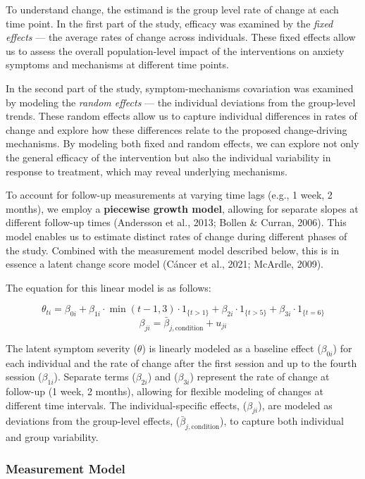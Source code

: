 \documentclass[
  man,floatsintext]{apa7}
\begin{document}
To understand change, the estimand is the group level rate of change at each time point.
In the first part of the study, efficacy was examined by the \emph{fixed effects} --- the average rates of change across individuals.
These fixed effects allow us to assess the overall population-level impact of the interventions on anxiety symptoms and mechanisms at different time points.

In the second part of the study, symptom-mechanisms covariation was examined by modeling the \emph{random effects} --- the individual deviations from the group-level trends.
These random effects allow us to capture individual differences in rates of change and explore how these differences relate to the proposed change-driving mechanisms.
By modeling both fixed and random effects, we can explore not only the general efficacy of the intervention but also the individual variability in response to treatment, which may reveal underlying mechanisms.

To account for follow-up measurements at varying time lags (e.g., 1 week, 2 months), we employ a \textbf{piecewise growth model}, allowing for separate slopes at different follow-up times (Andersson et al., 2013; Bollen \& Curran, 2006).
This model enables us to estimate distinct rates of change during different phases of the study.
Combined with the measurement model described below, this is in essence a latent change score model (Cáncer et al., 2021; McArdle, 2009).

The equation for this linear model is as follows:

\[\theta_{ti} = \beta_{0i} + \beta_{1i} \cdot \min(t-1, 3) \cdot 1_{\{t > 1\}} + \beta_{2i} \cdot 1_{\{t > 5\}} + \beta_{3i} \cdot 1_{\{t=6\}}\]
\[\beta_{ji} = \bar{\beta}_{j,\text{condition}} + u_{ji}\]

The latent symptom severity (\(\theta\)) is linearly modeled as a baseline effect (\(\beta_{0i}\)) for each individual and the rate of change after the first session and up to the fourth session (\(\beta_{1i}\)).
Separate terms (\(\beta_{2i}\)) and (\(\beta_{3i}\)) represent the rate of change at follow-up (1 week, 2 months), allowing for flexible modeling of changes at different time intervals.
The individual-specific effects, (\(\beta_{ji}\)), are modeled as deviations from the group-level effects, (\(\bar{\beta}_{j,\text{condition}}\)), to capture both individual and group variability.

\subsubsection{Measurement Model}\label{measurement-model}
\end{document}
